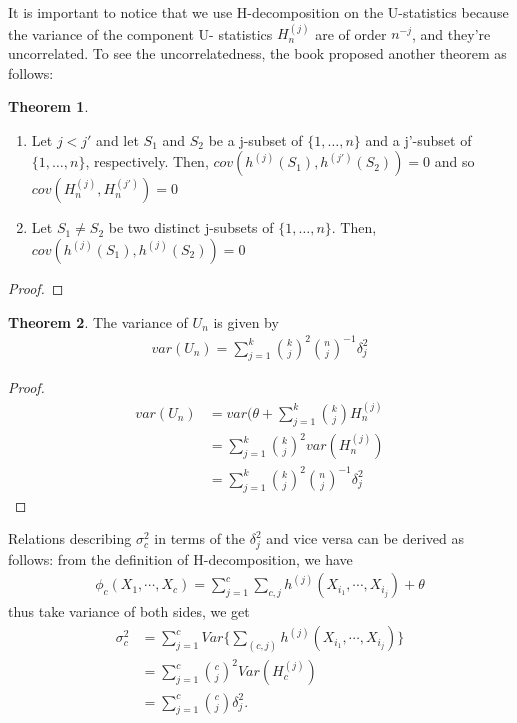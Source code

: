 \documentclass{article}
\theoremstyle{definition}
\newtheorem{theorem}{Theorem}
\numberwithin{Def}{section}
\begin{document}
    It is important to notice that we use H-decomposition on the U-statistics because the variance of the component U- statistics $H_n^{(j)}$ are of order $n^{-j}$, and they're uncorrelated. To see the uncorrelatedness, the book proposed another theorem as follows:
    
    \begin{theorem}
    \begin{enumerate} [label = (\roman*)]
        \item Let $j <j'$ and let $S_1$ and $S_2$ be a j-subset of $\{1, \dotsc, n\}$ and a j'-subset of $\{1, \dotsc, n\}$, respectively. Then, $cov(h^{(j)}(S_1), h^{(j')}(S_2)) = 0$ and so $cov(H_n^{(j)}, H_n^{(j')}) = 0$
        \item Let $S_1 \neq S_2$ be two distinct j-subsets of $\{1, \dotsc, n\}$. Then, $cov(h^{(j)}(S_1), h^{(j)}(S_2)) = 0$
    \end{enumerate}
    \end{theorem}
    
    
\begin{proof}

\end{proof}

    
    \begin{theorem}
    The variance of $U_n$ is given by 
    \begin{align}
        var(U_n) = \sum_{j=1}^k {k \choose j}^2 {n \choose j}^{-1}\delta_j^2
    \end{align}
    \end{theorem}
    \begin{proof}
    \begin{align*}
        var(U_n) &= var(\theta + \sum_{j=1}^k {k \choose j}H_n^{(j)} \\
        &= \sum_{j=1}^k {k \choose j}^2var(H_n^{(j)})\\
        &= \sum_{j=1}^k {k \choose j}^2 {n \choose j}^{-1}\delta_j^2
    \end{align*}
    \end{proof}

    Relations describing $\sigma_{c}^2$ in terms of the $\delta_j^2 $ and vice versa can be derived as follows: from the definition of H-decomposition, we have 
    \begin{align*}
        \phi_c (X_1, \cdots, X_c) = \sum_{j = 1}^c \sum_{c,j} h^{(j)} (X_{i_{1}}, \cdots , X_{i_j}) + \theta
    \end{align*}
    thus take variance of both sides, we get 
    \begin{align*}
        \sigma_{c}^2 &= \sum_{j = 1}^c Var\{ \sum_{(c, j)} h^{(j)} (X_{i_{1}}, \cdots , X_{i_j})\} \\
        &= \sum_{j = 1}^c {c \choose j}^2 Var( H_c^{(j)}) \\ 
        &= \sum_{j = 1}^c {c \choose j} \delta_j^2.
    \end{align*}
    
\end{document}
